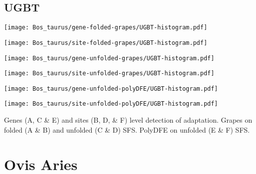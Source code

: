 \documentclass{article}
\begin{document}
\subsection{UGBT}
\centering
\begin{minipage}{0.49\linewidth}
    \texttt{[image: Bos\_taurus/gene-folded-grapes/UGBT-histogram.pdf]}
\end{minipage}%
\hfill
\begin{minipage}{0.49\linewidth}
    \texttt{[image: Bos\_taurus/site-folded-grapes/UGBT-histogram.pdf]}
\end{minipage}
\hfill
\begin{minipage}{0.49\linewidth}
    \texttt{[image: Bos\_taurus/gene-unfolded-grapes/UGBT-histogram.pdf]}
\end{minipage}%
\hfill
\begin{minipage}{0.49\linewidth}
    \texttt{[image: Bos\_taurus/site-unfolded-grapes/UGBT-histogram.pdf]}
\end{minipage}
\hfill
\begin{minipage}{0.49\linewidth}
    \texttt{[image: Bos\_taurus/gene-unfolded-polyDFE/UGBT-histogram.pdf]}
\end{minipage}%
\hfill
\begin{minipage}{0.49\linewidth}
    \texttt{[image: Bos\_taurus/site-unfolded-polyDFE/UGBT-histogram.pdf]}
\end{minipage}
\hfill
\flushleft
Genes (A, C \& E) and sites (B, D, \& F) level detection of adaptation.
Grapes on folded (A \& B) and unfolded (C \& D) SFS.
PolyDFE on unfolded (E \& F) SFS.

\pagebreak
\section{Ovis Aries}
\end{document}
